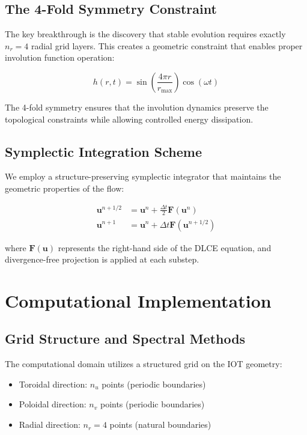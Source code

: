 \documentclass[conference]{IEEEtran}
\begin{document}
\subsection{The 4-Fold Symmetry Constraint}

The key breakthrough is the discovery that stable evolution requires exactly $n_r = 4$ radial grid layers. This creates a geometric constraint that enables proper involution function operation:

\begin{equation}
h(r,t) = \sin\left(\frac{4\pi r}{r_{\max}}\right) \cos(\omega t)
\end{equation}

The 4-fold symmetry ensures that the involution dynamics preserve the topological constraints while allowing controlled energy dissipation.

\subsection{Symplectic Integration Scheme}

We employ a structure-preserving symplectic integrator that maintains the geometric properties of the flow:

\begin{align}
\mathbf{u}^{n+1/2} &= \mathbf{u}^n + \frac{\Delta t}{2} \mathbf{F}(\mathbf{u}^n) \\
\mathbf{u}^{n+1} &= \mathbf{u}^n + \Delta t \mathbf{F}(\mathbf{u}^{n+1/2})
\end{align}

where $\mathbf{F}(\mathbf{u})$ represents the right-hand side of the DLCE equation, and divergence-free projection is applied at each substep.

\section{Computational Implementation}

\subsection{Grid Structure and Spectral Methods}

The computational domain utilizes a structured grid on the IOT geometry:
\begin{itemize}
\item Toroidal direction: $n_u$ points (periodic boundaries)
\item Poloidal direction: $n_v$ points (periodic boundaries)
\item Radial direction: $n_r = 4$ points (natural boundaries)
\end{itemize}
\end{document}
